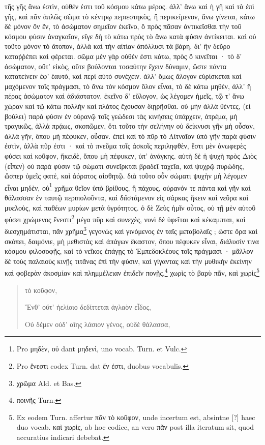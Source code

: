 \documentclass[a4paper, 11pt, oneside, polutonikogreek, german]{article}
\begin{document}
τῆς γῆς ἄνω ἐστὶν, οὐθέν ἐστι τοῦ κόσμου κάτω μέρος. ἀλλ' ἄνω καὶ ἡ γῆ καὶ τὰ ἐπὶ γῆς, καὶ πᾶν ἁπλῶς σῶμα τὸ κέντρῳ περιεστηκὸς, ἢ περικείμενον, ἄνω γίνεται, κάτω δὲ μόνον ὂν ἓν, τὸ ἀσώματον σημεῖον ἐκεῖνο, ὃ πρὸς πᾶσαν ἀντικεῖσθαι τὴν τοῦ κόσμου φύσιν ἀναγκαῖον, εἴγε δὴ τὸ κάτω πρὸς τὸ ἄνω κατὰ φύσιν ἀντίκειται. καὶ οὐ τοῦτο μόνον τὸ ἄτοπον, ἀλλὰ καὶ τὴν αἰτίαν ἀπόλλυσι τὰ βάρη, δι' ἣν δεῦρο καταῤῥέπει καὶ φέρεται. σῶμα μὲν γὰρ οὐθέν ἐστι κάτω, πρὸς ὃ κινεῖται · τὸ δ' ἀσώματον, οὔτ' εἰκὸς, οὔτε βούλονται τοσαύτην ἔχειν δύναμιν, ὥστε πάντα κατατείνειν ἐφ' ἑαυτὸ, καὶ περὶ αὐτὸ συνέχειν. ἀλλ' ὅμως ἄλογον εὑρίσκεται καὶ μαχόμενον τοῖς πράγμασι, τὸ ἄνω τὸν κόσμον ὅλον εἶναι, τὸ δὲ κάτω μηθὲν, ἀλλ' ἢ πέρας ἀσώματον καὶ ἀδιάστατον. ἐκεῖνο δ' εὔλογον, ὡς λέγομεν ἡμεῖς, τῷ τ' ἄνω χώραν καὶ τῷ κάτω πολλὴν καὶ πλάτος ἔχουσαν διῃρῆσθαι. οὐ μὴν ἀλλὰ θέντες, (εἰ βούλει) παρὰ φύσιν ἐν οὐρανῷ τοῖς γεώδεσι τὰς κινήσεις ὑπάρχειν, ἀτρέμα, μὴ τραγικῶς, ἀλλὰ πρᾴως, σκοπῶμεν, ὅτι τοῦτο τὴν σελήνην οὐ δείκνυσι γῆν μὴ οὖσαν, ἀλλὰ γῆν, ὅπου μὴ πέφυκεν, οὖσαν. ἐπεὶ καὶ τὸ πῦρ τὸ Λἰτναῖον ὑπὸ γῆν παρὰ φύσιν ἐστὶν, ἀλλὰ πῦρ ἐστι · καὶ τὸ πνεῦμα τοῖς ἀσκοῖς περιληφθὲν, ἔστι μὲν ἀνωφερὲς φύσει καὶ κοῦφον, ἥκειδὲ, ὅπου μὴ πέφυκεν, ὑπ' ἀνάγκης. αὐτὴ δὲ ἡ ψυχὴ πρὸς Διὸς (εἶπεν) οὐ παρὰ φύσιν τῷ σώματι συνεῖρκται βραδεῖ ταχεῖα, καὶ ψυχρῷ πυρώδης, ὥσπερ ὑμεῖς φατὲ, καὶ ἀόρατος αἰσθητῷ. διὰ τοῦτο οὖν σώματι ψυχὴν μὴ λέγομεν εἶναι μηδὲν, οὐ\footnote{Pro μηδὲν, οὐ dant μηδενὶ, uno vocab. Turn. et Vulc.} χρῆμα θεῖον ὑπὸ βρίθους, ἢ πάχους, οὐρανόν τε πάντα καὶ γῆν καὶ θάλασσαν ἐν ταυτῷ περιπολοῦντα, καὶ διϊστάμενον εἰς σάρκας ἥκειν καὶ νεῦρα καὶ μυελοὺς, καὶ παθέων μυρίων μετὰ ὑγρότητος. ὁ δὲ Ζεὺς ἡμῖν οὗτος, οὐ τῇ μὲν αὐτοῦ φύσει χρώμενος ἔνεστι\footnote{Pro ἔνεστι codex Turn. dat ἕν ἐστι, duobus vocabulis.} μέγα πῦρ καὶ συνεχὲς, νυνὶ δὲ ὑφεῖται καὶ κέκαμπται, καὶ διεσχημάτισται, πᾶν χρῆμα\footnote{χρῶμα Ald. et Bas.} γεγονὼς καὶ γινόμενος ἐν ταῖς μεταβολαῖς ; ὥστε ὅρα καὶ σκόπει, δαιμόνιε, μὴ μεθιστὰς καὶ ἀπάγων ἕκαστον, ὅπου πέφυκεν εἶναι, διάλυσίν τινα κόσμου φιλοσοφῇς, καὶ τὸ νεῖκος ἐπάγῃς τὸ Ἐμπεδοκλέους τοῖς πράγμασι · μᾶλλον δὲ τοὺς παλαιοὺς κινῇς τιτᾶνας ἐπὶ τὴν φύσιν, καὶ γίγαντας καὶ τὴν μυθικὴν ἐκείνην καὶ φοβερὰν ἀκοσμίαν καὶ πλημμέλειαν ἐπιδεῖν πονῇς,\footnote{ποινῆς Turn.} χωρὶς τὸ βαρὺ πᾶν, καὶ χωρὶς\footnote{Ex eodem Turn. affertur πᾶν τὸ κοῦφον, unde incertum est, absintne [?] haec duo vocab. καὶ χωρὶς, ab hoc codice, an vero πᾶν post illa iteratum sit, quod accuratius indicari debebat.}
\begin{quotation}\small
τὸ κοῦφον,

Ἔνθ' οὔτ' ἠελίοιο δεδίττεται ἀγλαὸν εἶδος,

Οὐ δέμεν οὐδ' αἴης λάσιον γένος, οὐδὲ θάλασσα,
\end{quotation}
\end{document}
